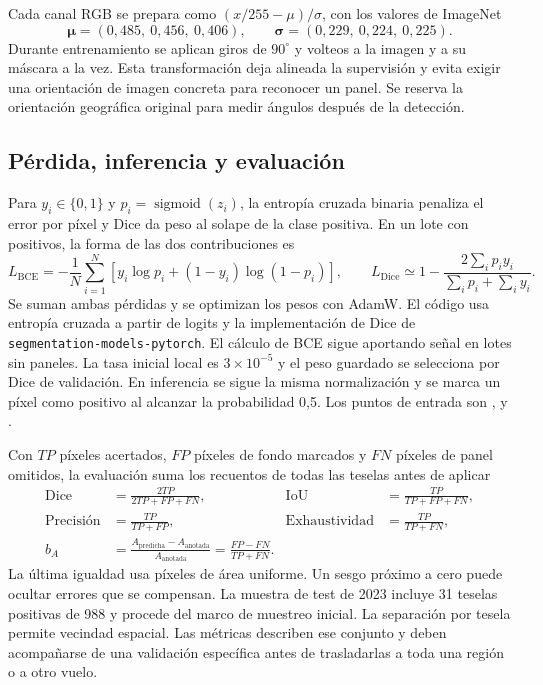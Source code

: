 \documentclass[11pt,a4paper]{article}
\begin{document}
Cada canal RGB se prepara como \((x/255-\mu)/\sigma\), con los valores de ImageNet
\[
\boldsymbol\mu=(0{,}485,\ 0{,}456,\ 0{,}406),\qquad
\boldsymbol\sigma=(0{,}229,\ 0{,}224,\ 0{,}225).
\]
Durante entrenamiento se aplican giros de \(90^\circ\) y volteos a la imagen y a su máscara a la vez. Esta transformación deja alineada la supervisión y evita exigir una orientación de imagen concreta para reconocer un panel. Se reserva la orientación geográfica original para medir ángulos después de la detección.

\subsection{Pérdida, inferencia y evaluación}

Para \(y_i\in\{0,1\}\) y \(p_i=\operatorname{sigmoid}(z_i)\), la entropía cruzada binaria penaliza el error por píxel y Dice da peso al solape de la clase positiva. En un lote con positivos, la forma de las dos contribuciones es
\[
L_{\mathrm{BCE}}=-\frac1N\sum_{i=1}^N
   \left[y_i\log p_i+(1-y_i)\log(1-p_i)\right],
\qquad
L_{\mathrm{Dice}}\simeq 1-\frac{2\sum_i p_i y_i}{\sum_i p_i+\sum_i y_i}.
\]
Se suman ambas pérdidas y se optimizan los pesos con AdamW. El código usa entropía cruzada a partir de logits y la implementación de Dice de \texttt{segmentation-models-pytorch}. El cálculo de BCE sigue aportando señal en lotes sin paneles. La tasa inicial local es \(3\times10^{-5}\) y el peso guardado se selecciona por Dice de validación. En inferencia se sigue la misma normalización y se marca un píxel como positivo al alcanzar la probabilidad 0,5. Los puntos de entrada son ,  y . \cite{adamw}

Con \(TP\) píxeles acertados, \(FP\) píxeles de fondo marcados y \(FN\) píxeles de panel omitidos, la evaluación suma los recuentos de todas las teselas antes de aplicar
\[
\begin{aligned}
\mathrm{Dice}&=\frac{2TP}{2TP+FP+FN},
&\mathrm{IoU}&=\frac{TP}{TP+FP+FN},\\
\text{Precisión}&=\frac{TP}{TP+FP},
&\mathrm{Exhaustividad}&=\frac{TP}{TP+FN},\\
b_A&=\frac{A_{\mathrm{predicha}}-A_{\mathrm{anotada}}}{A_{\mathrm{anotada}}}
=\frac{FP-FN}{TP+FN}.
\end{aligned}
\]
La última igualdad usa píxeles de área uniforme. Un sesgo próximo a cero puede ocultar errores que se compensan. La muestra de test de 2023 incluye 31 teselas positivas de 988 y procede del marco de muestreo inicial. La separación por tesela permite vecindad espacial. Las métricas describen ese conjunto y deben acompañarse de una validación específica antes de trasladarlas a toda una región o a otro vuelo.
\end{document}

